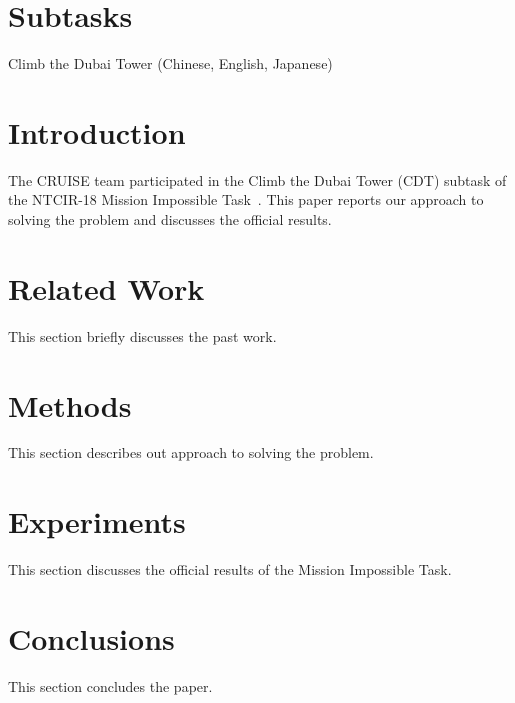 \documentclass[sigconf,article]{acmart}
\begin{document}
\section*{Subtasks}

Climb the Dubai Tower (Chinese, English, Japanese)

\section{Introduction}
The CRUISE team participated in the Climb the Dubai Tower (CDT) subtask of the NTCIR-18 Mission Impossible Task~\cite{mioverview}. This paper reports our approach to solving the problem and discusses the official results.


\section{Related Work}
This section briefly discusses the past work.

\section{Methods}
This section describes out approach to solving the problem.

\section{Experiments}
This section discusses the official results of the Mission Impossible Task.


\section{Conclusions}
This section concludes the paper.





\end{document}
